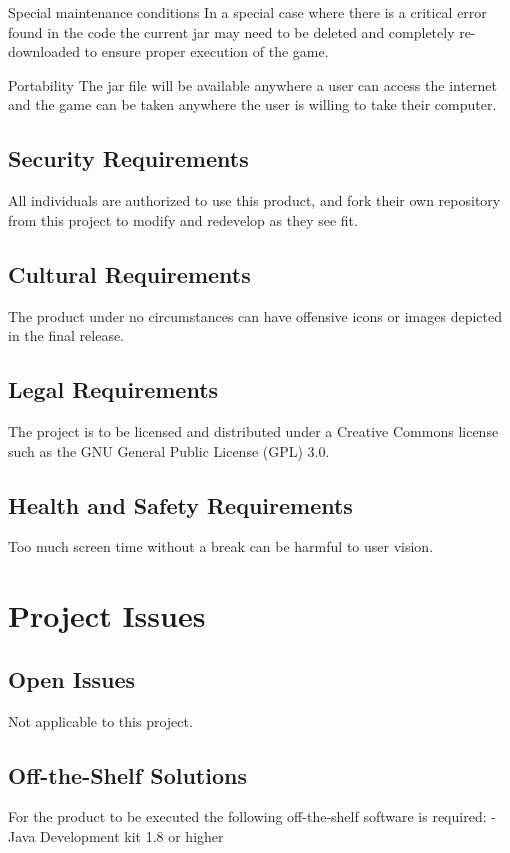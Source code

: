 \documentclass[12pt, titlepage]{article}
\begin{document}
Special maintenance conditions
In a special case where there is a critical error found in the code the current jar may need to be deleted and completely re-downloaded to ensure proper execution of the game.
 
Portability
The jar file will be available anywhere a user can access the internet and the game can be taken anywhere the user is willing to take their computer. 

\subsection{Security Requirements}
All individuals are authorized to use this product, and fork their own repository from this project to modify and redevelop as they see fit.

\subsection{Cultural Requirements}
The product under no circumstances can have offensive icons or images depicted in the final release.

\subsection{Legal Requirements}
The project is to be licensed and distributed under a Creative Commons license such as the GNU General Public License (GPL) 3.0.

\subsection{Health and Safety Requirements}
Too much screen time without a break can be harmful to user vision. 

\section{Project Issues}
\subsection{Open Issues}
Not applicable to this project.

\subsection{Off-the-Shelf Solutions}
For the product to be executed the following off-the-shelf software is required: 
-Java Development kit 1.8 or higher
\end{document}
